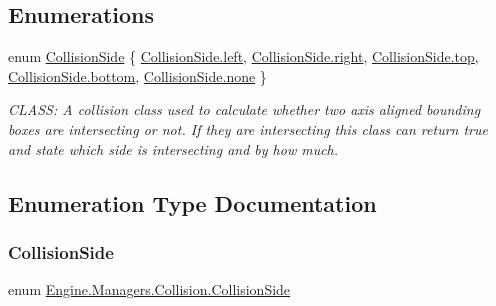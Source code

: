\subsection*{Enumerations}
\begin{DoxyCompactItemize}
\item 
enum \hyperlink{a00268_addb954cde1b34937cfd0a187a154c8af}{Collision\+Side} \{ \newline
\hyperlink{a00268_addb954cde1b34937cfd0a187a154c8afa811882fecd5c7618d7099ebbd39ea254}{Collision\+Side.\+left}, 
\hyperlink{a00268_addb954cde1b34937cfd0a187a154c8afa7c4f29407893c334a6cb7a87bf045c0d}{Collision\+Side.\+right}, 
\hyperlink{a00268_addb954cde1b34937cfd0a187a154c8afab28354b543375bfa94dabaeda722927f}{Collision\+Side.\+top}, 
\hyperlink{a00268_addb954cde1b34937cfd0a187a154c8afa71f262d796bed1ab30e8a2d5a8ddee6f}{Collision\+Side.\+bottom}, 
\newline
\hyperlink{a00268_addb954cde1b34937cfd0a187a154c8afa334c4a4c42fdb79d7ebc3e73b517e6f8}{Collision\+Side.\+none}
 \}\begin{DoxyCompactList}\small\item\em C\+L\+A\+SS\+: A collision class used to calculate whether two axis aligned bounding boxes are intersecting or not. If they are intersecting this class can return true and state which side is intersecting and by how much. \end{DoxyCompactList}
\end{DoxyCompactItemize}


\subsection{Enumeration Type Documentation}
\mbox{\label{a00268_addb954cde1b34937cfd0a187a154c8af}} 
\subsubsection{\texorpdfstring{Collision\+Side}{CollisionSide}}
{\footnotesize\ttfamily enum \hyperlink{a00268_addb954cde1b34937cfd0a187a154c8af}{Engine.\+Managers.\+Collision.\+Collision\+Side}\hspace{0.3cm}{\ttfamily [strong]}}



